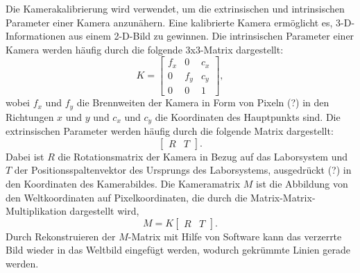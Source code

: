 \documentclass[arbeit=studie,oneside,BCOR=12mm]{ArbeitRST}
\begin{document}
Die Kamerakalibrierung wird verwendet, um die extrinsischen und intrinsischen
Parameter einer Kamera anzunähern. Eine kalibrierte Kamera ermöglicht es,
3-D-Informationen aus einem 2-D-Bild zu gewinnen. Die intrinsischen Parameter
einer Kamera werden häufig durch die folgende 3x3-Matrix dargestellt:
\begin{equation} 
    K = 
    \begin{bmatrix} 
        f_x & 0 & c_x\\ 
        0 & f_y & c_y\\ 
        0 & 0 & 1
    \end{bmatrix}, 
\end{equation} 
wobei $f_x$ und $f_y$ die Brennweiten der Kamera in Form von Pixeln (?) in den
Richtungen $x$ und $y$ und $c_x$ und $c_y$ die Koordinaten des Hauptpunkts
sind. Die extrinsischen Parameter werden häufig durch die folgende Matrix
dargestellt: 
\begin{equation}
    \begin{bmatrix} R & T \end{bmatrix}. 
\end{equation} 
Dabei ist $R$ die Rotationsmatrix der Kamera in Bezug auf das Laborsystem und $T$
der Positionsspaltenvektor des Ursprungs des Laborsystems, ausgedrückt (?) in den
Koordinaten des Kamerabildes. Die Kameramatrix $M$ ist die Abbildung von
den Weltkoordinaten auf Pixelkoordinaten, die durch die
Matrix-Matrix-Multiplikation dargestellt wird, 
\begin{equation} 
    M = K 
    \begin{bmatrix} 
        R & T
    \end{bmatrix}. 
\end{equation} 
Durch Rekonstruieren der $M$-Matrix mit Hilfe von Software kann das verzerrte
Bild wieder in das Weltbild eingefügt werden, wodurch gekrümmte Linien gerade
werden. \\
\end{document}
